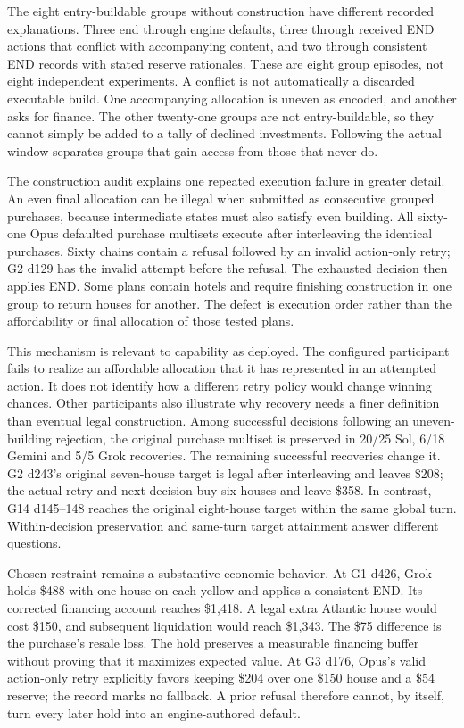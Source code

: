 The eight entry-buildable groups without construction have different recorded explanations. Three end through engine defaults, three through received END actions that conflict with accompanying content, and two through consistent END records with stated reserve rationales. These are eight group episodes, not eight independent experiments. A conflict is not automatically a discarded executable build. One accompanying allocation is uneven as encoded, and another asks for finance. The other twenty-one groups are not entry-buildable, so they cannot simply be added to a tally of declined investments. Following the actual window separates groups that gain access from those that never do.

The construction audit explains one repeated execution failure in greater detail. An even final allocation can be illegal when submitted as consecutive grouped purchases, because intermediate states must also satisfy even building. All sixty-one Opus defaulted purchase multisets execute after interleaving the identical purchases. Sixty chains contain a refusal followed by an invalid action-only retry; G2 d129 has the invalid attempt before the refusal. The exhausted decision then applies END. Some plans contain hotels and require finishing construction in one group to return houses for another. The defect is execution order rather than the affordability or final allocation of those tested plans.

This mechanism is relevant to capability as deployed. The configured participant fails to realize an affordable allocation that it has represented in an attempted action. It does not identify how a different retry policy would change winning chances. Other participants also illustrate why recovery needs a finer definition than eventual legal construction. Among successful decisions following an uneven-building rejection, the original purchase multiset is preserved in 20/25 Sol, 6/18 Gemini and 5/5 Grok recoveries. The remaining successful recoveries change it. G2 d243's original seven-house target is legal after interleaving and leaves \$208; the actual retry and next decision buy six houses and leave \$358. In contrast, G14 d145--148 reaches the original eight-house target within the same global turn. Within-decision preservation and same-turn target attainment answer different questions.

Chosen restraint remains a substantive economic behavior. At G1 d426, Grok holds \$488 with one house on each yellow and applies a consistent END. Its corrected financing account reaches \$1,418. A legal extra Atlantic house would cost \$150, and subsequent liquidation would reach \$1,343. The \$75 difference is the purchase's resale loss. The hold preserves a measurable financing buffer without proving that it maximizes expected value. At G3 d176, Opus's valid action-only retry explicitly favors keeping \$204 over one \$150 house and a \$54 reserve; the record marks no fallback. A prior refusal therefore cannot, by itself, turn every later hold into an engine-authored default.

